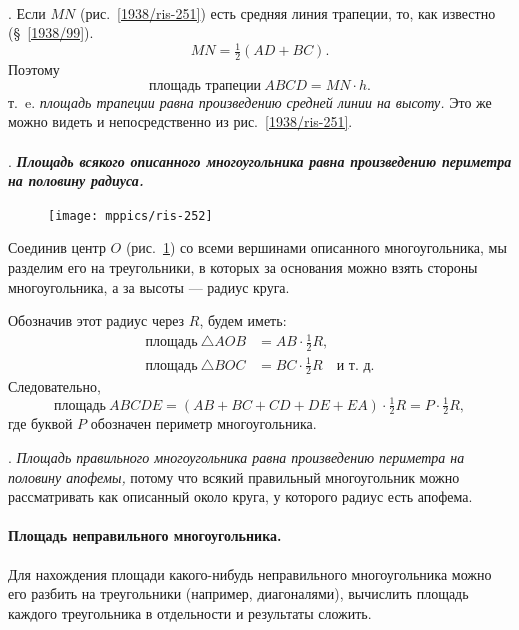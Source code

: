 \documentclass[oneside]{book}
\begin{document}
\paragraph{}\label{1938/251}
.
Если $MN$ (рис.~\ref{1938/ris-251}) есть средняя линия трапеции, то, как известно (§~\ref{1938/99}).
\[MN = \tfrac12(AD+BC).\]
Поэтому
\[\text{площадь трапеции}~ABCD=MN\cdot  h.\]
т.~e. \emph{площадь трапеции равна произведению средней линии на высоту.}
Это же можно видеть и непосредственно из рис.~\ref{1938/ris-251}.

\paragraph{}\label{1938/252}
.
\textbf{\emph{Площадь всякого описанного многоугольника равна произведению периметра на половину радиуса.}}

\begin{figure}
\centering
\texttt{[image: mppics/ris-252]}
\caption{}\label{1938/ris-252}
\end{figure}

Соединив центр $O$ (рис.~\ref{1938/ris-252}) со всеми вершинами описанного многоугольника, мы разделим его на треугольники, в которых за основания можно взять стороны многоугольника, а за высоты — радиус круга.

Обозначив этот радиус через $R$, будем иметь:
\begin{align*}
\text{площадь}~\triangle AOB&=AB \cdot  \tfrac12R,
\\
\text{площадь}~\triangle BOC &= BC \cdot  \tfrac12R\quad\text{и~т.~д.}
\end{align*}
Следовательно,
\[\text{площадь}~ABCDE = (AB+BC+CD+DE+EA) \cdot  \tfrac12R= P \cdot \tfrac12R,\]
где буквой $P$ обозначен периметр многоугольника.

.
\emph{Площадь правильного многоугольника равна произведению периметра на половину апофемы,} потому что всякий правильный многоугольник можно рассматривать как описанный около круга, у которого радиус есть апофема.

\paragraph{Площадь неправильного многоугольника.}\label{1938/253}
Для нахождения площади какого-нибудь неправильного многоугольника можно его разбить на треугольники (например, диагоналями), вычислить площадь каждого треугольника в отдельности и результаты сложить.
\end{document}

